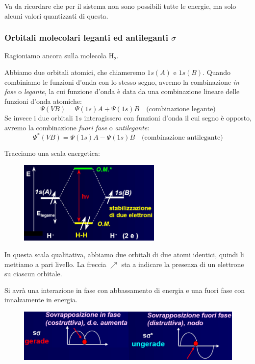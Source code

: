 Va da ricordare che per il sistema non sono possibili tutte le energie, ma solo alcuni valori quantizzati di questa.
\subsubsection{Orbitali molecolari leganti ed antileganti $\sigma$}

Ragioniamo ancora sulla molecola H$_2$.

Abbiamo due orbitali atomici, che chiameremo $1s(A)$ e $1s(B)$. Quando combiniamo le funzioni d'onda con lo stesso segno, avremo la combinazione \textit{in fase} o \textit{legante}, la cui funzione d'onda è data da una combinazione lineare delle funzioni d'onda atomiche:
$$\Psi(VB)=\Psi(1s)A + \Psi(1s)B \quad \text{(combinazione legante)}$$
Se invece i due orbitali $1s$ interagissero con funzioni d'onda il cui segno è opposto, avremo la combinazione \textit{fuori fase} o \textit{antilegante}:
$$\Psi^*(VB)=\Psi(1s)A - \Psi(1s)B \quad \text{(combinazione antilegante)}$$

Tracciamo una scala energetica:

\begin{figure}[htp]
    \centering
    \includegraphics[width=7cm]{immagini/scala_energia_H_2.png}
\end{figure}

In questa scala qualitativa, abbiamo due orbitali di due atomi identici, quindi li mettiamo a pari livello. La freccia $\nearrow$ sta a indicare la presenza di un elettrone su ciascun orbitale.

Si avrà una interazione in fase con abbassamento di energia e una fuori fase con innalzamente in energia.

\begin{figure}[htp]
    \centering
    \includegraphics[width=12cm]{immagini/sovrapposizione_in_fase_e_fuori_fase.png}
\end{figure}


